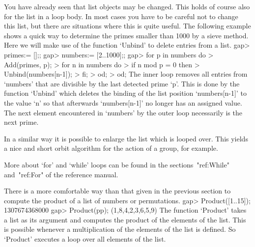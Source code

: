 You have already seen that list objects may be  changed.   This holds  of
course also for the  list in a loop body.  In most  cases  you have to be
careful not  to change this list, but there are situations  where this is
quite useful.  The following example  shows a quick way  to determine the
primes smaller than 1000 by a sieve method.  Here we will make use of the
function `Unbind' to delete entries from a list.
\beginexample
gap> primes:= [];;
gap> numbers:= [2..1000];;
gap> for p in numbers do
>       Add(primes, p);
>       for n in numbers do
>          if n mod p = 0 then
>             Unbind(numbers[n-1]);
>          fi;
>       od;
>    od;
\endexample
The inner loop  removes all entries from `numbers' that are  divisible by
the last detected prime `p'.  This is done by the function `Unbind' which
deletes the binding of the list position  `numbers[n-1]' to the value `n'
so that afterwards `numbers[n-1]' no longer has  an  assigned value.  The
next  element encountered in `numbers'  by the outer  loop necessarily is
the next prime.

In a similar way it is possible to enlarge the list which is looped over.
This yields a nice and short orbit  algorithm for the  action of a group,
for example.

More about `for' and `while' loops can be found in the
sections~"ref:While" and~"ref:For" of the reference manual.


There is a more comfortable way than that given in the previous section to
compute the product of a list of numbers or permutations.
\beginexample
gap> Product([1..15]);
1307674368000
gap> Product(pp);
(1,8,4,2,3,6,5,9)
\endexample
The function  `Product'  takes a  list as  its argument and computes  the
product  of  the  elements  of the  list.   This  is possible whenever  a
multiplication of  the elements of the list is defined.  So  `Product' 
executes a loop over all elements of the list.

